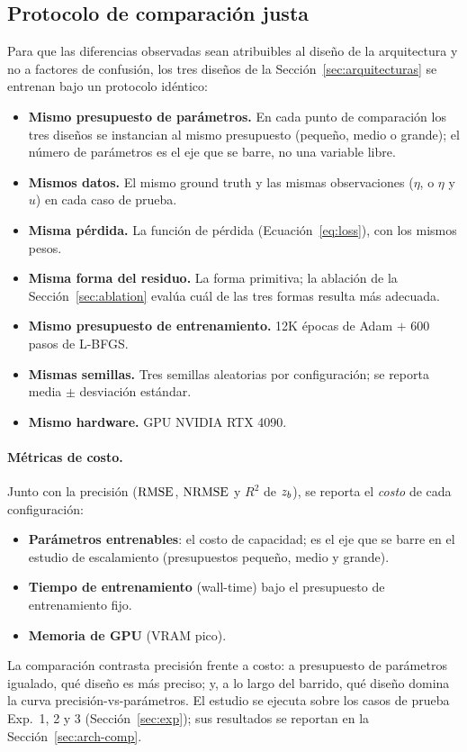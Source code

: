 \subsection{Protocolo de comparación justa}
\label{sec:protocolo}

Para que las diferencias observadas sean atribuibles al diseño de la
arquitectura y no a factores de confusión, los tres diseños de la
Sección~\ref{sec:arquitecturas} se entrenan bajo un protocolo idéntico:

\begin{itemize}
  \item \textbf{Mismo presupuesto de parámetros.} En cada punto de comparación
        los tres diseños se instancian al mismo presupuesto (pequeño, medio o
        grande); el número de parámetros es el eje que se barre, no una
        variable libre.
  \item \textbf{Mismos datos.} El mismo ground truth y las mismas
        observaciones ($\eta$, o $\eta$ y $u$) en cada caso de prueba.
  \item \textbf{Misma pérdida.} La función de pérdida
        (Ecuación~\ref{eq:loss}), con los mismos pesos.
  \item \textbf{Misma forma del residuo.} La forma primitiva; la ablación de
        la Sección~\ref{sec:ablation} evalúa cuál de las tres formas resulta
        más adecuada.
  \item \textbf{Mismo presupuesto de entrenamiento.} 12K épocas de Adam $+$
        600 pasos de L-BFGS.
  \item \textbf{Mismas semillas.} Tres semillas aleatorias por configuración;
        se reporta media $\pm$ desviación estándar.
  \item \textbf{Mismo hardware.} GPU NVIDIA RTX 4090.
\end{itemize}

\paragraph{Métricas de costo.}
Junto con la precisión ($\mathrm{RMSE}$, $\mathrm{NRMSE}$ y $R^2$ de $z_b$), se reporta el
\emph{costo} de cada configuración:
\begin{itemize}
  \item \textbf{Parámetros entrenables}: el costo de capacidad; es el eje que
        se barre en el estudio de escalamiento (presupuestos pequeño, medio y
        grande).
  \item \textbf{Tiempo de entrenamiento} (wall-time) bajo el presupuesto de
        entrenamiento fijo.
  \item \textbf{Memoria de GPU} (VRAM pico).
\end{itemize}
La comparación contrasta precisión frente a costo: a presupuesto de parámetros
igualado, qué diseño es más preciso; y, a lo largo del barrido, qué diseño
domina la curva precisión-vs-parámetros. El estudio se ejecuta sobre los casos
de prueba Exp.~1, 2 y 3 (Sección~\ref{sec:exp}); sus resultados se reportan en
la Sección~\ref{sec:arch-comp}.

